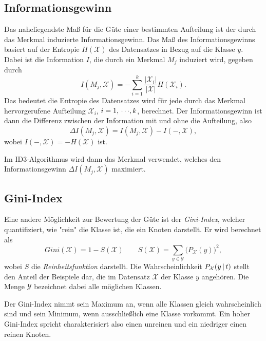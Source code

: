 		\subsection{Informationsgewinn}
			Das naheliegendste Maß für die Güte einer bestimmten Aufteilung ist der durch das Merkmal induzierte Informationsgewinn. Das Maß des Informationsgewinns basiert auf der Entropie \( H(\mathcal{X}) \) des Datensatzes in Bezug auf die Klasse \(y\). Dabei ist die Information \(I\), die durch ein Merkmal \(M_j\) induziert wird, gegeben durch
			\begin{equation}
				I(M_j, \mathcal{X}) = -\!\sum_{i = 1}^{k} \frac{\lvert \mathcal{X}_i \rvert}{\lvert \mathcal{X} \rvert} H(\mathcal{X}_i).
			\end{equation}
			Das bedeutet die Entropie des Datensatzes wird für jede durch das Merkmal hervorgerufene Aufteilung \( \mathcal{X}_i \), \( i = 1,\,\cdots\!,k \), berechnet. Der Informationsgewinn ist dann die Differenz zwischen der Information mit und ohne die Aufteilung, also
			\begin{equation}
				\Delta I(M_j, \mathcal{X}) = I(M_j, \mathcal{X}) - I(-, \mathcal{X}),
			\end{equation}
			wobei \( I(-, \mathcal{X}) = -H(\mathcal{X}) \) ist.

			Im ID3-Algorithmus wird dann das Merkmal verwendet, welches den Informationsgewinn \( \Delta I(M_j, \mathcal{X}) \) maximiert.

		\subsection{Gini-Index}
			Eine andere Möglichkeit zur Bewertung der Güte ist der \emph{Gini-Index}, welcher quantifiziert, wie "rein" die Klasse ist, die ein Knoten darstellt. Er wird berechnet als
			\begin{equation}
				\textit{Gini}(\mathcal{X}) = 1 - S(\mathcal{X})
				\qquad
				S(\mathcal{X}) = \sum_{y \in \mathcal{Y}} \big( P_{\mathcal{X}}(y) \big)^2,
			\end{equation}
			wobei \(S\) die \emph{Reinheitsfunktion} darstellt. Die Wahrscheinlichkeit \( P_{\mathcal{X}}(y \,\vert\, t) \) stellt den Anteil der Beispiele dar, die im Datensatz \(\mathcal{X}\) der Klasse \(y\) angehören. Die Menge \(\mathcal{Y}\) bezeichnet dabei alle möglichen Klassen.

			Der Gini-Index nimmt sein Maximum an, wenn alle Klassen gleich wahrscheinlich sind und sein Minimum, wenn ausschließlich eine Klasse vorkommt. Ein hoher Gini-Index spricht charakterisiert also einen unreinen und ein niedriger einen reinen Knoten.


